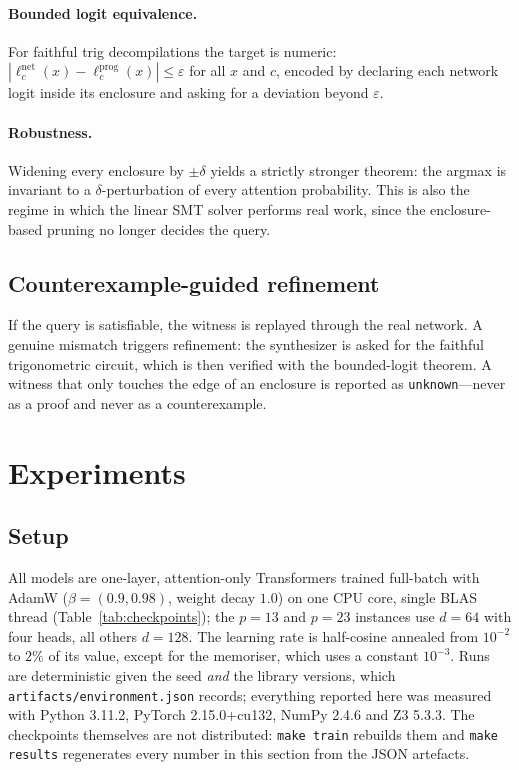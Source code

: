 \documentclass[11pt]{article}
\newcommand{\code}[1]{\texttt{#1}}
\begin{document}
\paragraph{Bounded logit equivalence.}
For faithful trig decompilations the target is numeric:
$|\ell_c^{\text{net}}(x) - \ell_c^{\text{prog}}(x)| \le \varepsilon$ for all $x$
and $c$, encoded by declaring each network logit inside its enclosure and asking
for a deviation beyond $\varepsilon$.

\paragraph{Robustness.}
Widening every enclosure by $\pm\delta$ yields a strictly stronger theorem: the
argmax is invariant to a $\delta$-perturbation of every attention probability.
This is also the regime in which the linear SMT solver performs real work, since
the enclosure-based pruning no longer decides the query.

\subsection{Counterexample-guided refinement}

If the query is satisfiable, the witness is replayed through the real network.
A genuine mismatch triggers refinement: the synthesizer is asked for the
faithful trigonometric circuit, which is then verified with the bounded-logit
theorem. A witness that only touches the edge of an enclosure is reported as
\code{unknown}---never as a proof and never as a counterexample.

\section{Experiments}
\label{sec:results}

\subsection{Setup}

All models are one-layer, attention-only Transformers trained full-batch with AdamW ($\beta=(0.9,0.98)$, weight decay $1.0$) on one CPU core, single BLAS thread (Table~\ref{tab:checkpoints}); the $p=13$ and $p=23$ instances use $d=64$ with four heads, all others $d=128$. The learning rate is half-cosine annealed from $10^{-2}$ to $2\%$ of its value, except for the memoriser, which uses a constant $10^{-3}$. Runs are deterministic given the seed \emph{and} the library versions, which \code{artifacts/environment.json} records; everything reported here was measured with Python 3.11.2, PyTorch 2.15.0+cu132, NumPy 2.4.6 and Z3 5.3.3. The checkpoints themselves are not distributed: \code{make train} rebuilds them and \code{make results} regenerates every number in this section from the JSON artefacts.
\end{document}
